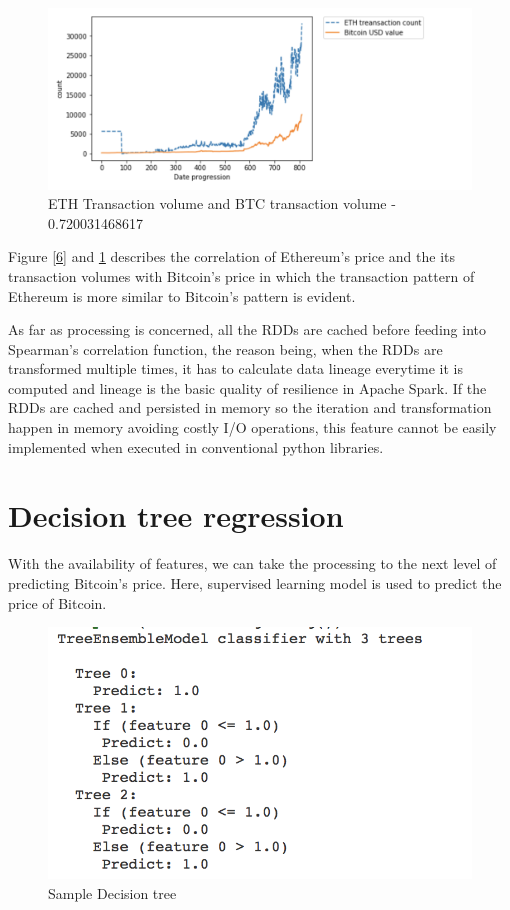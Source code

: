 \documentclass[sigconf]{acmart}
\begin{document}
\begin{figure}[!ht]
  \centering\includegraphics[width=\columnwidth]{PROJECT/images/ethtrancount.png}
  \caption{ETH Transaction volume and BTC transaction volume - 0.720031468617 }
  \label{7}
\end{figure}

Figure \ref{6} and \ref{7} describes the correlation of Ethereum's price and the its transaction volumes with Bitcoin's price in which the transaction pattern of Ethereum is more similar to Bitcoin's pattern is evident. 

As far as processing is concerned, all the RDDs are cached before feeding into Spearman's correlation function, the reason being, when the RDDs are transformed multiple times, it has to calculate data lineage everytime it is computed and lineage is the basic quality of resilience in Apache Spark. If the RDDs are cached and persisted in memory so the iteration and transformation happen in memory avoiding costly I/O operations, this feature cannot be easily implemented when executed in conventional python libraries.


\section{Decision tree regression}
With the availability of features, we can take the processing to the next level of predicting Bitcoin's price. Here, supervised learning model is used to predict the price of Bitcoin.

\begin{figure}[!ht]
  \centering\includegraphics[width=\columnwidth]{PROJECT/images/Decisiontree.png}
  \caption{Sample Decision tree}
  \label{fig:8decisiongree}
\end{figure}
 
\end{document}
